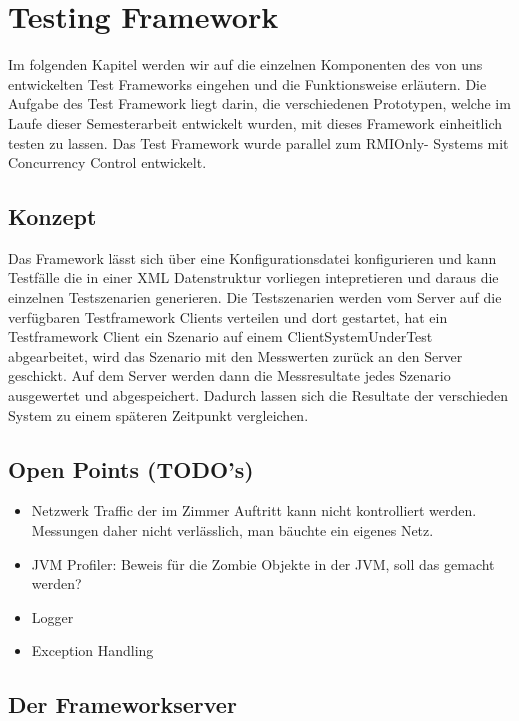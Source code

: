 \section{Testing Framework}
\label{sec:testing Framework}
Im folgenden Kapitel werden wir auf die einzelnen Komponenten des von uns entwickelten Test Frameworks eingehen und die Funktionsweise erläutern. Die Aufgabe des Test Framework liegt darin, die verschiedenen Prototypen, welche im Laufe dieser Semesterarbeit entwickelt wurden, mit dieses Framework einheitlich testen zu lassen. Das Test Framework wurde parallel zum RMIOnly- Systems mit Concurrency Control entwickelt.

\subsection{Konzept}
Das Framework lässt sich über eine Konfigurationsdatei konfigurieren und kann Testfälle die in einer XML Datenstruktur vorliegen intepretieren und daraus die einzelnen Testszenarien generieren. Die Testszenarien werden vom Server auf die verfügbaren Testframework Clients verteilen und dort gestartet, hat ein Testframework Client ein Szenario auf einem ClientSystemUnderTest abgearbeitet, wird das Szenario mit den Messwerten zurück an den Server geschickt. Auf dem Server werden dann die Messresultate jedes Szenario ausgewertet und abgespeichert. Dadurch lassen sich die Resultate der verschieden System zu einem späteren Zeitpunkt vergleichen.

\subsection{Open Points (TODO's)}
\begin{itemize}	
\item Netzwerk Traffic der im Zimmer Auftritt kann nicht kontrolliert werden. Messungen daher nicht verlässlich, man bäuchte ein eigenes Netz.
\item JVM Profiler: Beweis für die Zombie Objekte in der JVM, soll das gemacht werden?
\item Logger
\item Exception Handling
\end{itemize}



\subsection{Der Frameworkserver}
\label{sec:test-FW Server}
